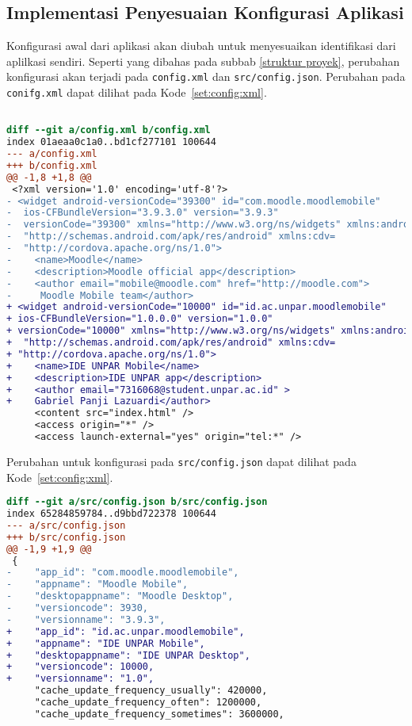 \subsection{Implementasi Penyesuaian Konfigurasi Aplikasi}

Konfigurasi awal dari aplikasi akan diubah untuk menyesuaikan identifikasi dari aplilkasi sendiri. Seperti yang dibahas pada subbab \ref{struktur proyek}, perubahan konfigurasi akan terjadi pada \texttt{config.xml} dan \texttt{src/config.json}. Perubahan pada \texttt{conifg.xml} dapat dilihat pada \mbox{Kode \ref{set:config:xml}}. 

\begin{lstlisting}[language=diff, frame=single, label ={set:config:xml}, caption = Perubahan pada file \texttt{config.xml} ]

diff --git a/config.xml b/config.xml
index 01aeaa0c1a0..bd1cf277101 100644
--- a/config.xml
+++ b/config.xml
@@ -1,8 +1,8 @@
 <?xml version='1.0' encoding='utf-8'?>
- <widget android-versionCode="39300" id="com.moodle.moodlemobile" 
-  ios-CFBundleVersion="3.9.3.0" version="3.9.3" 
-  versionCode="39300" xmlns="http://www.w3.org/ns/widgets" xmlns:android=
-  "http://schemas.android.com/apk/res/android" xmlns:cdv= 
-  "http://cordova.apache.org/ns/1.0">
-    <name>Moodle</name>
-    <description>Moodle official app</description>
-    <author email="mobile@moodle.com" href="http://moodle.com">
-     Moodle Mobile team</author>
+ <widget android-versionCode="10000" id="id.ac.unpar.moodlemobile" 
+ ios-CFBundleVersion="1.0.0.0" version="1.0.0" 
+ versionCode="10000" xmlns="http://www.w3.org/ns/widgets" xmlns:android=
+  "http://schemas.android.com/apk/res/android" xmlns:cdv=
+ "http://cordova.apache.org/ns/1.0">
+    <name>IDE UNPAR Mobile</name>
+    <description>IDE UNPAR app</description>
+    <author email="7316068@student.unpar.ac.id" >
+    Gabriel Panji Lazuardi</author>
     <content src="index.html" />
     <access origin="*" />
     <access launch-external="yes" origin="tel:*" />
\end{lstlisting} 

Perubahan untuk konfigurasi pada \texttt{src/config.json} dapat dilihat pada \mbox{Kode \ref{set:config:xml}}. 

\begin{lstlisting}[language=diff, frame=single, label ={set:src:config:json}, caption = Perubahan pada file \texttt{src/config.json} ]
diff --git a/src/config.json b/src/config.json
index 65284859784..d9bbd722378 100644
--- a/src/config.json
+++ b/src/config.json
@@ -1,9 +1,9 @@
 {
-    "app_id": "com.moodle.moodlemobile",
-    "appname": "Moodle Mobile",
-    "desktopappname": "Moodle Desktop",
-    "versioncode": 3930,
-    "versionname": "3.9.3",
+    "app_id": "id.ac.unpar.moodlemobile",
+    "appname": "IDE UNPAR Mobile",
+    "desktopappname": "IDE UNPAR Desktop",
+    "versioncode": 10000,
+    "versionname": "1.0",
     "cache_update_frequency_usually": 420000,
     "cache_update_frequency_often": 1200000,
     "cache_update_frequency_sometimes": 3600000,
\end{lstlisting}

